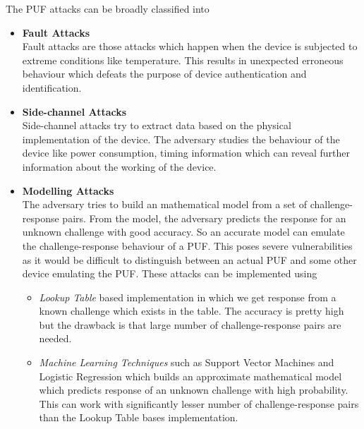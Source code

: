 The PUF attacks can be broadly classified into
\begin{itemize}
\item \textbf{Fault Attacks}\\ Fault attacks are those attacks which happen when the device is subjected to extreme conditions like temperature. This results in unexpected erroneous behaviour which defeats the purpose of device authentication and identification.

\item \textbf{Side-channel Attacks}\\ Side-channel attacks try to extract data based on the physical implementation of the device. The adversary studies the behaviour of the device like power consumption, timing information which can reveal further information about the working of the device.

\item \textbf{Modelling Attacks}\\
The adversary tries to build an mathematical model  from a set of challenge-response pairs. From the model, the adversary predicts the response for an unknown challenge with good accuracy. So an accurate model can emulate the challenge-response behaviour of a PUF. This poses severe vulnerabilities as it would be difficult to distinguish between an actual PUF and some other device emulating the PUF. These attacks can be implemented using
\begin{itemize}
\item \textit{Lookup Table} based implementation in which we get response from a known challenge which exists in the table. The accuracy is pretty high but the drawback is that large number of challenge-response pairs are needed.
\item \textit{Machine Learning Techniques} such as Support Vector Machines and Logistic Regression which builds an approximate mathematical model which predicts response of an unknown challenge with high probability. This can work with significantly lesser number of challenge-response pairs than the Lookup Table bases implementation.

\end{itemize}
\end{itemize}
